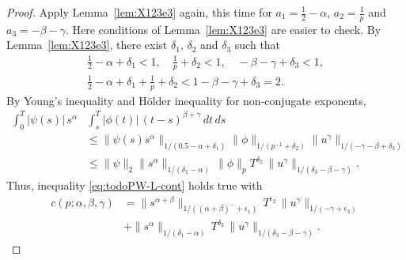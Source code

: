 \documentclass{article}
\theoremstyle{plain}
\theoremstyle{remark}
\theoremstyle{definition}
\begin{document}
\begin{proof}
Apply Lemma~\ref{lem:X123e3} again,
this time for $a_1=\frac12 - \alpha$,
$a_2 = \frac{1}{p}$ and $a_3 = -\beta-\gamma$.
Here conditions of Lemma~\ref{lem:X123e3}
are easier to check.
By Lemma~\ref{lem:X123e3}, there exist
$\delta_1$, $\delta_2$ and $\delta_3$
such that
\begin{gather*}
\frac12 - \alpha + \delta_1  < 1, \quad
\frac{1}{p} + \delta_2 < 1, \quad
-\beta-\gamma+\delta_3<1, \\
\frac12 - \alpha + \delta_1 +
\frac{1}{p} + \delta_2 < 1
-\beta-\gamma+\delta_3 = 2.
\end{gather*}
By Young's inequality
 and H\"older inequality
for non-conjugate exponents,
	\begin{align*}
		\int_0^T |\psi(s)|\, s^\alpha
		&\int_s^T |\phi(t)|\, (t{-}s)^{\beta+\gamma}
		\, dt \, ds
\\ &\le
\|\psi(s) s^\alpha\|_{1/(0.5-\alpha + \delta_1)}
\|\phi\|_{1/(p^{-1}+\delta_2)}
\|u^\gamma\|_{1/(-\gamma-\beta+\delta_3)}
\\ &\le
\|\psi\|_2 \|s^\alpha\|_{1/(\delta_1-\alpha)} \,
\|\phi\|_p T^{\delta_2} \,
\|u^\gamma\|_{1/(\delta_3-\beta-\gamma)}.
\end{align*}
Thus, inequality \eqref{eq:todoPW-L-cont}
holds true with
\begin{align*}
c(p;\alpha,\beta,\gamma)
&=
\|s^{\alpha+\beta}\|_{1/((\alpha+\beta)^- + \epsilon_1)} \,
 T^{\epsilon_2} \,
\|u^\gamma\|_{1/(-\gamma+\epsilon_3)}
\\ &+
\|s^\alpha\|_{1/(\delta_1-\alpha)} \,
 T^{\delta_2} \,
\|u^\gamma\|_{1/(\delta_3-\beta-\gamma)}.
\end{align*}


\end{proof}
\end{document}
